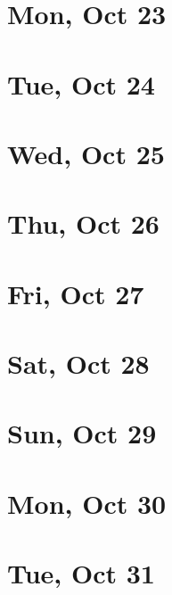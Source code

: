 	\section{Mon, Oct 23}
		
	\section{Tue, Oct 24}
		
	\section{Wed, Oct 25}
		
	\section{Thu, Oct 26}
		
	\section{Fri, Oct 27}
		
	\section{Sat, Oct 28}
		
	\section{Sun, Oct 29}
		
	\section{Mon, Oct 30}
		
	\section{Tue, Oct 31}
		
